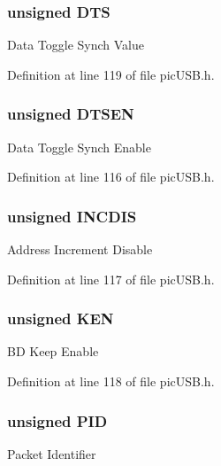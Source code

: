 \hypertarget{union_b_d_stat_a74db087bfe32cd33c459191f7a4aeb13}{
\subsubsection[{D\-T\-S}]{\setlength{\rightskip}{0pt plus 5cm}unsigned D\-T\-S}}\label{union_b_d_stat_a74db087bfe32cd33c459191f7a4aeb13}
Data Toggle Synch Value 

Definition at line 119 of file pic\-U\-S\-B.\-h.

\hypertarget{union_b_d_stat_adeff6f5de2d8ca0cfa956560288c3541}{
\subsubsection[{D\-T\-S\-E\-N}]{\setlength{\rightskip}{0pt plus 5cm}unsigned D\-T\-S\-E\-N}}\label{union_b_d_stat_adeff6f5de2d8ca0cfa956560288c3541}
Data Toggle Synch Enable 

Definition at line 116 of file pic\-U\-S\-B.\-h.

\hypertarget{union_b_d_stat_a39604d4252cc3e5f9551bd2cd3b54584}{
\subsubsection[{I\-N\-C\-D\-I\-S}]{\setlength{\rightskip}{0pt plus 5cm}unsigned I\-N\-C\-D\-I\-S}}\label{union_b_d_stat_a39604d4252cc3e5f9551bd2cd3b54584}
Address Increment Disable 

Definition at line 117 of file pic\-U\-S\-B.\-h.

\hypertarget{union_b_d_stat_aaf39e9ac8929e7da9cb427f1b0de0934}{
\subsubsection[{K\-E\-N}]{\setlength{\rightskip}{0pt plus 5cm}unsigned K\-E\-N}}\label{union_b_d_stat_aaf39e9ac8929e7da9cb427f1b0de0934}
B\-D Keep Enable 

Definition at line 118 of file pic\-U\-S\-B.\-h.

\hypertarget{union_b_d_stat_a97b41b25e06fd7857dcc6217c160a8ad}{
\subsubsection[{P\-I\-D}]{\setlength{\rightskip}{0pt plus 5cm}unsigned P\-I\-D}}\label{union_b_d_stat_a97b41b25e06fd7857dcc6217c160a8ad}
Packet Identifier 

